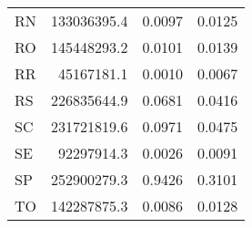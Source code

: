 \begin{table}[htb]
\begin{tabular}{l|rrr}
    RN &          133036395.4 &                  0.0097 &    0.0125 \\
    RO &          145448293.2 &                  0.0101 &    0.0139 \\
    RR &           45167181.1 &                  0.0010 &    0.0067 \\
    RS &          226835644.9 &                  0.0681 &    0.0416 \\
    SC &          231721819.6 &                  0.0971 &    0.0475 \\
    SE &           92297914.3 &                  0.0026 &    0.0091 \\
    SP &          252900279.3 &                  0.9426 &    0.3101 \\
    TO &          142287875.3 &                  0.0086 &    0.0128 \\
    \bottomrule
    \end{tabular}
\fdadospesquisa
\end{table}

